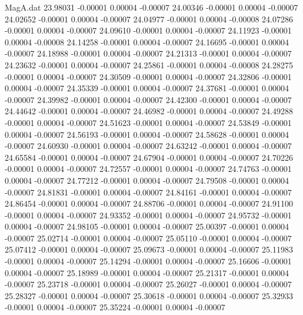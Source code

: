 \begin{filecontents}{MagA.dat}
  23.98031   -0.00001    0.00004   -0.00007
  24.00346   -0.00001    0.00004   -0.00007
  24.02652   -0.00001    0.00004   -0.00007
  24.04977   -0.00001    0.00004   -0.00008
  24.07286   -0.00001    0.00004   -0.00007
  24.09610   -0.00001    0.00004   -0.00007
  24.11923   -0.00001    0.00004   -0.00008
  24.14258   -0.00001    0.00004   -0.00007
  24.16695   -0.00001    0.00004   -0.00007
  24.18988   -0.00001    0.00004   -0.00007
  24.21313   -0.00001    0.00004   -0.00007
  24.23632   -0.00001    0.00004   -0.00007
  24.25861   -0.00001    0.00004   -0.00008
  24.28275   -0.00001    0.00004   -0.00007
  24.30509   -0.00001    0.00004   -0.00007
  24.32806   -0.00001    0.00004   -0.00007
  24.35339   -0.00001    0.00004   -0.00007
  24.37681   -0.00001    0.00004   -0.00007
  24.39982   -0.00001    0.00004   -0.00007
  24.42300   -0.00001    0.00004   -0.00007
  24.44642   -0.00001    0.00004   -0.00007
  24.46982   -0.00001    0.00004   -0.00007
  24.49288   -0.00001    0.00004   -0.00007
  24.51623   -0.00001    0.00004   -0.00007
  24.53849   -0.00001    0.00004   -0.00007
  24.56193   -0.00001    0.00004   -0.00007
  24.58628   -0.00001    0.00004   -0.00007
  24.60930   -0.00001    0.00004   -0.00007
  24.63242   -0.00001    0.00004   -0.00007
  24.65584   -0.00001    0.00004   -0.00007
  24.67904   -0.00001    0.00004   -0.00007
  24.70226   -0.00001    0.00004   -0.00007
  24.72557   -0.00001    0.00004   -0.00007
  24.74763   -0.00001    0.00004   -0.00007
  24.77212   -0.00001    0.00004   -0.00007
  24.79508   -0.00001    0.00004   -0.00007
  24.81831   -0.00001    0.00004   -0.00007
  24.84161   -0.00001    0.00004   -0.00007
  24.86454   -0.00001    0.00004   -0.00007
  24.88706   -0.00001    0.00004   -0.00007
  24.91100   -0.00001    0.00004   -0.00007
  24.93352   -0.00001    0.00004   -0.00007
  24.95732   -0.00001    0.00004   -0.00007
  24.98105   -0.00001    0.00004   -0.00007
  25.00397   -0.00001    0.00004   -0.00007
  25.02714   -0.00001    0.00004   -0.00007
  25.05110   -0.00001    0.00004   -0.00007
  25.07412   -0.00001    0.00004   -0.00007
  25.09673   -0.00001    0.00004   -0.00007
  25.11983   -0.00001    0.00004   -0.00007
  25.14294   -0.00001    0.00004   -0.00007
  25.16606   -0.00001    0.00004   -0.00007
  25.18989   -0.00001    0.00004   -0.00007
  25.21317   -0.00001    0.00004   -0.00007
  25.23718   -0.00001    0.00004   -0.00007
  25.26027   -0.00001    0.00004   -0.00007
  25.28327   -0.00001    0.00004   -0.00007
  25.30618   -0.00001    0.00004   -0.00007
  25.32933   -0.00001    0.00004   -0.00007
  25.35224   -0.00001    0.00004   -0.00007

\end{filecontents}
